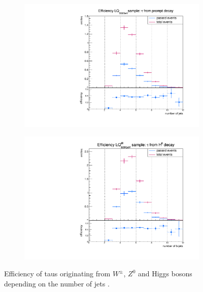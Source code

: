 \begin{figure}
  \centering
                \begin{subfigure}[t]{0.49\textwidth}
                \includegraphics[width=\textwidth]{figures/plots/ttH/Divided_promptnjets.pdf}
                \label{Divided:prompt:njets}
                \end{subfigure}
                \begin{subfigure}[t]{0.49\textwidth}
                \includegraphics[width=\textwidth]{figures/plots/ttH/Divided_fromHnjets.pdf}
                \label{Divided:fromH:njets}
                \end{subfigure}
\caption[Efficiency of taus originating from $W^\pm$, $Z^0$ and Higgs bosons for the Higgs background events.]{Efficiency of taus originating from $W^\pm$, $Z^0$ and Higgs bosons depending on the number of jets .}
\label{Divided:njets}
\end{figure}
